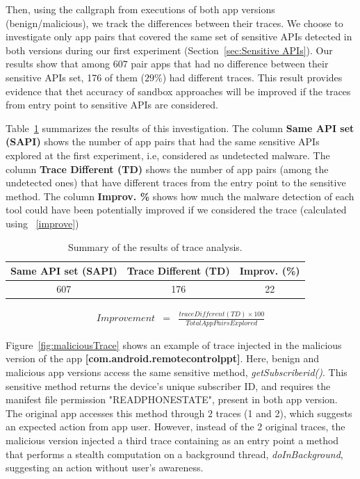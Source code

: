 Then, using the callgraph from executions of both app versions (benign/malicious), we track the differences between their traces. We choose to investigate only app pairs that covered the same set of sensitive APIs detected in both versions during our first experiment (Section~\ref{sec:Sensitive APIs}). Our results show that among $607$ pair apps that had no difference between their sensitive APIs set, 176 of them ($29$\%) had different traces. This result provides evidence that thet accuracy of sandbox approaches will be improved if the traces from entry point to sensitive APIs are considered.

Table~\ref{tab:pa} summarizes the results of this investigation. The column \textbf{Same API set (SAPI)} shows the number of app pairs that had the same sensitive APIs explored at the first experiment, i.e, considered as undetected malware. The column \textbf{Trace Different (TD)} shows the number of app pairs (among the undetected ones) that have different traces from the entry point to the sensitive method. The column \textbf{Improv. \%} shows how much the malware detection of each tool could have been potentially improved if we considered the trace (calculated using ~\eqref{improve})

\begin{table}[ht!]
  \caption{Summary of the results of trace analysis. }
  \centering
  \begin{small}
 \begin{tabular}{ccc}
   \toprule
   Same API set (SAPI) & Trace Different (TD) & Improv. (\%) \\   \midrule
   607 & 176 & 22 \\
 \bottomrule
 \end{tabular}
 \end{small}
 \label{tab:pa}
\end{table}



\begin{eqnarray}
Improvement & = & \frac{trace Different (TD) \times 100}{Total App Pairs Explored} 
\label{improve}
\end{eqnarray}


Figure~\ref{fig:maliciousTrace} shows an example of trace injected in the malicious version of the app \textbf{[com.android.remotecontrolppt]}. Here, benign and malicious app versions access the same sensitive method, \textit{getSubscriberid()}. This sensitive method returns the device's unique subscriber ID, and requires the manifest file permission "READ\underline{\space}PHONE\underline{\space}STATE", present in both app version. The original app accesses this method through $2$ traces (1 and 2), which suggests an expected action from app user. However, instead of the 2 original traces, the malicious version injected a third trace containing as an entry point a method that performs a stealth computation on a background thread, \textit{doInBackground}, suggesting an action without user's awareness.

